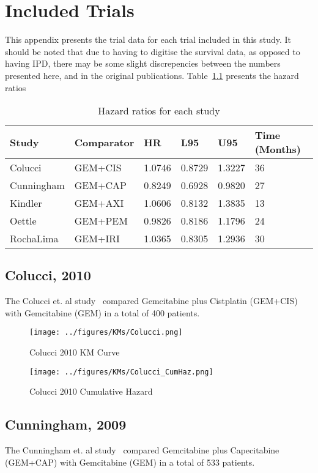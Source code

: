 \chapter{Included Trials}\label{trialData}

This appendix presents the trial data for each trial included in this study. It should be noted that due to having to digitise the survival data, as opposed to having IPD, there may be some slight discrepencies between the numbers presented here, and in the original publications. Table~\ref{hrtable} presents the hazard ratios

\begin{table}[h]
    \center
    \begin{tabular}{llllll}
    \hline
    Study      & Comparator & HR     & L95    & U95    & Time (Months) \\ \hline
    Colucci    & GEM+CIS    & 1.0746 & 0.8729 & 1.3227 & 36 \\
    Cunningham & GEM+CAP    & 0.8249 & 0.6928 & 0.9820 & 27 \\
    Kindler    & GEM+AXI    & 1.0606 & 0.8132 & 1.3835 & 13 \\
    Oettle     & GEM+PEM    & 0.9826 & 0.8186 & 1.1796 & 24 \\
    RochaLima  & GEM+IRI    & 1.0365 & 0.8305 & 1.2936 & 30 \\ \hline
    \end{tabular}
    \caption{Hazard ratios for each study}
    \label{hrtable}
    \end{table}
\section{Colucci, 2010}
The Colucci et. al study~\cite{colucci2010} compared Gemcitabine plus Cistplatin (GEM+CIS) with Gemcitabine (GEM) in a total of 400 patients. 

\begin{figure}
    \center
    \texttt{[image: ../figures/KMs/Colucci.png]}
    \caption{Colucci 2010 KM Curve}
    \label{col2010km}
\end{figure}

\begin{figure}
    \center
    \texttt{[image: ../figures/KMs/Colucci\_CumHaz.png]}
    \caption{Colucci 2010 Cumulative Hazard}
    \label{col2010ch}
\end{figure}

\newpage

\section{Cunningham, 2009}
The Cunningham et. al study~\cite{cunningham2009} compared Gemcitabine plus Capecitabine (GEM+CAP) with Gemcitabine (GEM) in a total of 533 patients. 

